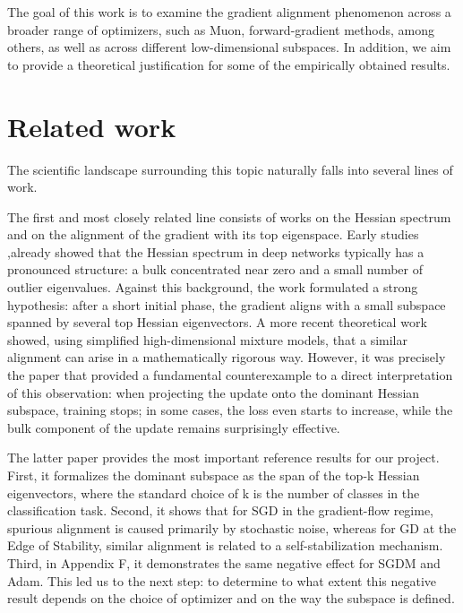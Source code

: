 \documentclass[conference]{IEEEtran}
\begin{document}
The goal of this work is to examine the gradient alignment phenomenon across a broader range of optimizers, such as Muon, forward-gradient methods, among others, as well as across different low-dimensional subspaces. In addition, we aim to provide a theoretical justification for some of the empirically obtained results.

\section{Related work}

The scientific landscape surrounding this topic naturally falls into several lines of work.

The first and most closely related line consists of works on the Hessian spectrum and on the alignment of the gradient with its top eigenspace. Early studies \citep{sagun2017eigenvalueshessiandeeplearning, sagun2018empiricalanalysishessianoverparametrized, ghorbani2019},already showed that the Hessian spectrum in deep networks typically has a pronounced structure: a bulk concentrated near zero and a small number of outlier eigenvalues. Against this background, the work \citet{GurAriGD} formulated a strong hypothesis: after a short initial phase, the gradient aligns with a small subspace spanned by several top Hessian eigenvectors. A more recent theoretical work \citet{ArousHighDimensional} showed, using simplified high-dimensional mixture models, that a similar alignment can arise in a mathematically rigorous way. However, it was precisely the paper \citet{SongDoesSGD} that provided a fundamental counterexample to a direct interpretation of this observation: when projecting the update onto the dominant Hessian subspace, training stops; in some cases, the loss even starts to increase, while the bulk component of the update remains surprisingly effective.

The latter paper provides the most important reference results for our project. First, it formalizes the dominant subspace as the span of the top-k Hessian eigenvectors, where the standard choice of k is the number of classes in the classification task. Second, it shows that for SGD in the gradient-flow regime, spurious alignment is caused primarily by stochastic noise, whereas for GD at the Edge of Stability, similar alignment is related to a self-stabilization mechanism. Third, in Appendix F, it demonstrates the same negative effect for SGDM and Adam. This led us to the next step: to determine to what extent this negative result depends on the choice of optimizer and on the way the subspace is defined.
\end{document}
